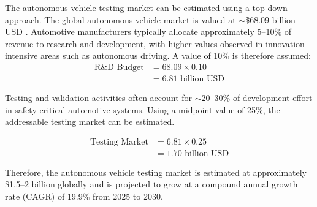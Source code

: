 The autonomous vehicle testing market can be estimated using a top-down approach. The global autonomous vehicle market is valued at $\sim$\$68.09 billion USD {\cite{grandview_autonomous_market}}. Automotive manufacturers typically allocate approximately 5--10\% of revenue to research and development, with higher values observed in innovation-intensive areas such as autonomous driving. A value of 10\% is therefore assumed:
\vspace{-9pt}
\begin{equation}
\begin{aligned}
\text{R\&D Budget} &= 68.09 \times 0.10 \\
&= 6.81 \text{ billion USD}
\end{aligned}
\end{equation}
\vspace{-2pt}

Testing and validation activities often account for $\sim$20--30\% {\cite{mckinsey_testing_validation}} of development effort in safety-critical automotive systems. Using a midpoint value of 25\%, the addressable testing market can be estimated.

\vspace{-15pt}
\begin{equation}
\begin{aligned}
\text{Testing Market} &= 6.81 \times 0.25 \\
&= 1.70 \text{ billion USD}
\end{aligned}
\end{equation}
\vspace{-5pt}

Therefore, the autonomous vehicle testing market is estimated at approximately \$1.5--2 billion globally and is projected to grow at a compound annual growth rate (CAGR) of 19.9\% {\cite{grandview_autonomous_market}} from 2025 to 2030. 


